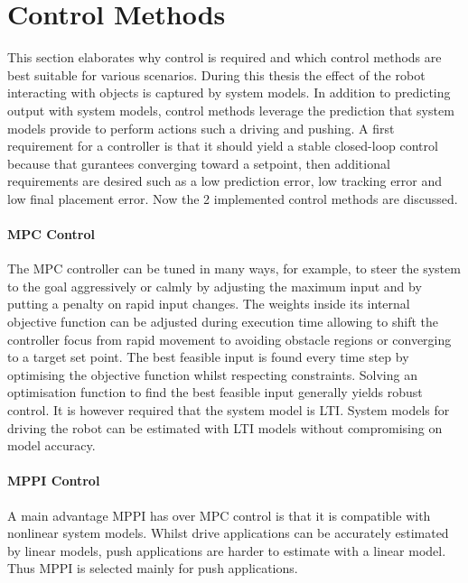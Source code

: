 \section{Control Methods}%
\label{sec:control_methods}
This section elaborates why control is required and which control methods are best suitable for various scenarios. During this thesis the effect of the robot interacting with objects is captured by system models. In addition to predicting output with system models, control methods leverage the prediction that system models provide to perform actions such a driving and pushing. A first requirement for a controller is that it should yield a stable closed-loop control because that gurantees converging toward a setpoint, then additional requirements are desired such as a low prediction error, low tracking error and low final placement error. Now the 2 implemented control methods are discussed.\bs

\paragraph{\acs{MPC} Control}

The \ac{MPC} controller can be tuned in many ways, for example, to steer the system to the goal aggressively or calmly by adjusting the maximum input and by putting a penalty on rapid input changes. The weights inside its internal objective function can be adjusted during execution time allowing to shift the controller focus from rapid movement to avoiding obstacle regions or converging to a target set point. The best feasible input is found every time step by optimising the objective function whilst respecting constraints. Solving an optimisation function to find the best feasible input generally yields robust control. It is however required that the system model is \ac{LTI}. System models for driving the robot can be estimated with \ac{LTI} models without compromising on model accuracy.

\paragraph{\acs{MPPI} Control}

A main advantage \ac{MPPI} has over \ac{MPC} control is that it is compatible with nonlinear system models. Whilst drive applications can be accurately estimated by linear models, push applications are harder to estimate with a linear model. Thus \ac{MPPI} is selected mainly for push applications.
\bs



